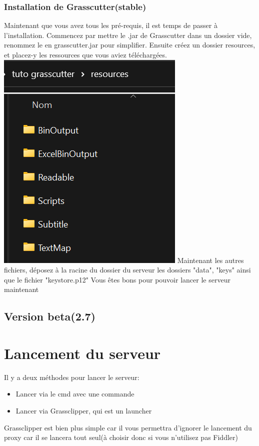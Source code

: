 \documentclass{article}
\begin{document}
\subsubsection{Installation de Grasscutter(stable)}
Maintenant que vous avez tous les pré-requis, il est temps de passer à l'installation.\newline
Commencez par mettre le .jar de Grasscutter dans un dossier vide, renommez le en grasscutter.jar pour simplifier.\newline
Ensuite créez un dossier resources, et placez-y les ressources que vous aviez téléchargées.\newline
\includegraphics[scale=1]{img/disp_resources.png}
Maintenant les autres fichiers, déposez à la racine du dossier du serveur les dossiers "data", "keys" ainsi que le fichier "keystore.p12"\newline
Vous êtes bons pour pouvoir lancer le serveur maintenant

\subsection{Version beta(2.7)}

\section{Lancement du serveur}
Il y a deux méthodes pour lancer le serveur:
\begin{itemize}
	\item Lancer via le cmd avec une commande
	\item Lancer via Grassclipper, qui est un launcher
\end{itemize}
Grassclipper est bien plus simple car il vous permettra d'ignorer le lancement du proxy car il se lancera tout seul(à choisir donc si vous n'utilisez pas Fiddler)
\end{document}
